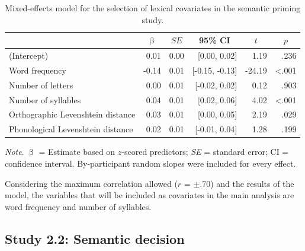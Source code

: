 \documentclass[
  12pt,
  man,floatsintext]{apa7}
\begin{document}
\begin{table}[!h]

\caption{\label{tab:semanticpriming-lexical-covariates-selection}Mixed-effects model for the selection of lexical covariates in the semantic priming study.}
\centering
\begin{threeparttable}
\begin{tabular}[t]{lrrrrr}
\toprule
\multicolumn{1}{c}{ } & \multicolumn{1}{c}{$\upbeta$} & \multicolumn{1}{c}{$SE$} & \multicolumn{1}{c}{95\% CI} & \multicolumn{1}{c}{$t$} & \multicolumn{1}{c}{$p$}\\
\midrule
(Intercept) & 0.01 & 0.00 & {}[0.00, 0.02] & 1.19 & .236\\
Word frequency & -0.14 & 0.01 & {}[-0.15, -0.13] & -24.19 & <.001\\
Number of letters & 0.00 & 0.01 & {}[-0.02, 0.02] & 0.12 & .903\\
Number of syllables & 0.04 & 0.01 & {}[0.02, 0.06] & 4.02 & <.001\\
Orthographic Levenshtein distance & 0.03 & 0.01 & {}[0.00, 0.05] & 2.19 & .029\\
Phonological Levenshtein distance & 0.02 & 0.01 & {}[-0.01, 0.04] & 1.28 & .199\\
\bottomrule
\end{tabular}
\begin{tablenotes}
\item \textit{\linebreak} 
\item \textit{Note}. $\upbeta$ = Estimate based on $z$-scored predictors; \textit{SE} = standard error; \linebreak \phantom{.}CI = confidence interval. By-participant random slopes were included for \linebreak \phantom{.}every effect.
\end{tablenotes}
\end{threeparttable}
\end{table}

Considering the maximum correlation allowed (\(r\) = \(\pm\).70) and the results of the model, the variables that will be included as covariates in the main analysis are word frequency and number of syllables.

\hypertarget{study-2.2-semantic-decision-1}{%
\subsection{Study 2.2: Semantic decision}\label{study-2.2-semantic-decision-1}}
\end{document}
